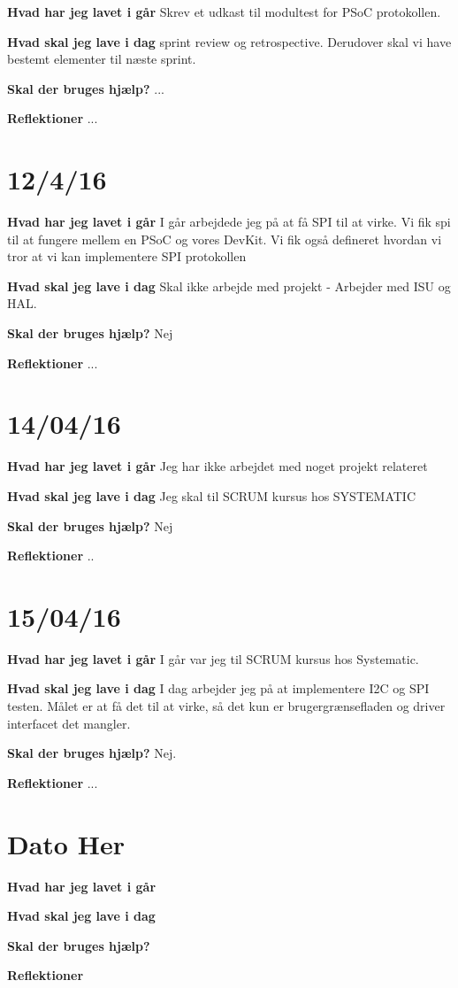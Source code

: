 \documentclass{article}
\begin{document}
	\textbf{Hvad har jeg lavet i går}
	Skrev et udkast til modultest for PSoC protokollen.
	
	\textbf{Hvad skal jeg lave i dag}
	sprint review og retrospective. Derudover skal vi have bestemt elementer til næste sprint.
	
	\textbf{Skal der bruges hjælp?}
	...
	
	\textbf{Reflektioner}
	...
	
	
	\section{12/4/16}
	
	\textbf{Hvad har jeg lavet i går}
	I går arbejdede jeg på at få SPI til at virke. Vi fik spi til at fungere mellem en PSoC og vores DevKit. Vi fik også defineret hvordan vi tror at vi kan implementere SPI protokollen
	
	\textbf{Hvad skal jeg lave i dag}
	Skal ikke arbejde med projekt - Arbejder med ISU og HAL.
	
	\textbf{Skal der bruges hjælp?}
	Nej
	
	\textbf{Reflektioner}
	...
	
	
	\section{14/04/16}
	
	\textbf{Hvad har jeg lavet i går}
	Jeg har ikke arbejdet med noget projekt relateret
	
	\textbf{Hvad skal jeg lave i dag}
	Jeg skal til SCRUM kursus hos SYSTEMATIC
	
	\textbf{Skal der bruges hjælp?}
	Nej
	
	\textbf{Reflektioner}
	..
	
	\section{15/04/16}
	
	\textbf{Hvad har jeg lavet i går}
	I går var jeg til SCRUM kursus hos Systematic.
	
	\textbf{Hvad skal jeg lave i dag}
	I dag arbejder jeg på at implementere I2C og SPI testen. Målet er at få det til at virke, så det kun er brugergrænsefladen og driver interfacet det mangler.
	
	\textbf{Skal der bruges hjælp?}
	Nej.
	
	\textbf{Reflektioner}
	...
	
	\section{Dato Her}
	
	\textbf{Hvad har jeg lavet i går}
	
	\textbf{Hvad skal jeg lave i dag}
	
	\textbf{Skal der bruges hjælp?}
	
	\textbf{Reflektioner}
	
	
\end{document}
